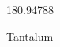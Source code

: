 \documentclass[12pt]{article}
\begin{document}
\hfill{}
\vfill
\begin{center}
  {\fontsize{50}{60}
  }

  180.94788

Tantalum
\end{center}
\vfill
\end{document}
